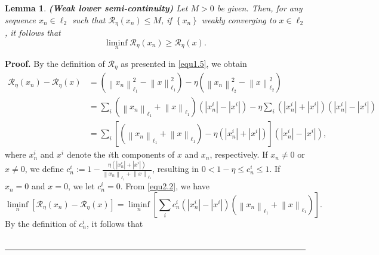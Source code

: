\documentclass[a4paper,12pt]{article}
\newtheorem{lemma}[theorem]{Lemma}
\numberwithin{equation}{section}
\newenvironment{proof}[1][Proof]{\textbf{#1.} }
{\ \rule{0.75em}{0.75em}\smallskip}
\begin{document}
\begin{lemma}\label{lem2.7}
    \textbf{(Weak lower semi-continuity)} Let $M>0$ be given. Then, for any sequence $x_{n}\in\ell_{2}$ such that $\mathcal{R}_{\eta}(x_{n})\leq M$, if $\left\{x_{n}\right\}$ weakly converging to $x\in\ell_{2}$, it follows that
    \begin{equation*}
        \liminf_{n}\mathcal{R}_{\eta}(x_{n}) \geq \mathcal{R}_{\eta}(x).
    \end{equation*}
\end{lemma}

\begin{proof}
    By the definition of $\mathcal{R}_{\eta}$ as presented in \eqref{equ1.5}, we obtain
    \begin{align}\label{equ2.2}
        \mathcal{R}_{\eta}(x_{n})-\mathcal{R}_{\eta}(x)
        & = \left(\left\|x_{n}\right\|_{\ell_{1}}^{2}-\left\|x\right\|_{\ell_{1}}^{2}\right)- \eta\left(\left\|x_{n}\right\|_{\ell_{2}}^{2}-\left\|x\right\|_{\ell_{2}}^{2}\right) \nonumber\\
        & =\sum_{i}\left(\left\|x_{n}\right\|_{\ell_{1}}+\left\|x\right\|_{\ell_{1}}\right) \left(\left|x_{n}^{i}\right|-\left|x^{i}\right|\right)- \eta\sum_{i}\left(\left|x_{n}^{i}\right|+ \left|x^{i}\right|\right)\left(\left|x_{n}^{i}\right|-\left|x^{i}\right|\right)  \nonumber\\
        & =\sum_{i}\left[\left(\left\|x_{n}\right\|_{\ell_{1}}+\left\|x\right\|_{\ell_{1}}\right) -\eta\left(\left|x_{n}^{i}\right|+\left|x^{i}\right|\right)\right]\left(\left|x_{n}^{i}\right|-\left|x^{i}\right|\right), 
    \end{align}
    where $x_{n}^{i}$ and $x^{i}$ denote the $i$th components of $x$ and $x_{n}$, respectively. If $x_{n}\neq 0$ or $x\neq 0$, we define $c_{n}^{i}:=1 -\frac{\eta\left(\left|x_{n}^{i}\right|+\left|x^{i}\right|\right)} {\left\|x_{n}\right\|_{\ell_{1}}+\left\|x\right\|_{\ell_{1}}}$, resulting in $0<1-\eta\leq c_{n}^{i}\leq 1$. If $x_{n}=0$ and $x=0$, we let $c_{n}^{i}=0$. From \eqref{equ2.2}, we have
    \begin{equation}\label{equ2.3}
        \liminf_{n}\left[\mathcal{R}_{\eta}(x_{n})-\mathcal{R}_{\eta}(x)\right] =\liminf_{n}\left[\sum_{i}c_{n}^{i}\left(\left|x_{n}^{i}\right|-\left|x^{i}\right|\right) \left(\left\|x_{n}\right\|_{\ell_{1}}+\left\|x\right\|_{\ell_{1}}\right)\right].
    \end{equation}
    By the definition of $c_{n}^{i}$, it follows that
    \begin{equation}\label{equ2.4}

\end{equation}
\end{proof}
\end{document}
